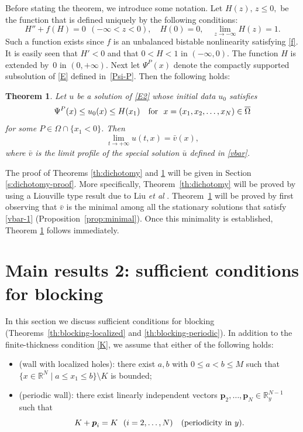 \documentclass[a4paper,12pt,fullpage]{article}
\numberwithin{equation}{section}
\newtheorem{Thm}{Theorem}
\def\R{{\mathbb R}}
\begin{document}
Before stating the theorem, we introduce some notation. Let $H(z),\,z\leq 0,$ be the function that is defined uniquely by the following conditions:
\[
H''+f(H)=0\ \ (-\infty<z<0), \quad H(0)=0,\quad \lim_{z\to-\infty}H(z)=1.
\]
Such a function exists since $f$ is an unbalanced bistable nonlinearity satisfying \eqref{f}. It is easily seen that $H'<0$ and that $0<H<1$ in $(-\infty,0)$. The function $H$ is extended by~$0$ in $(0,+\infty)$. Next let $\Psi^P(x)$ denote the compactly supported subsolution of \eqref{E} defined in~\eqref{Psi-P}. Then the following holds:

\begin{Thm}\label{th:general}
Let $u$ be a solution of \eqref{E2} whose initial data $u_0$ satisfies
\[
\Psi^P(x)\leq u_0(x)\leq H(x_1)\quad \hbox{for} \ \ x=(x_1,x_2,\ldots,x_N)\in \overline{\Omega}
\]
for some $P\in\Omega\cap\{x_1<0\}$. Then
\begin{equation}\label{limit-u}
\lim_{t\to+\infty} u(t,x)=\bar{v}(x),
\end{equation}
where $\bar{v}$ is the limit profile of the special solution $\bar{u}$ defined in \eqref{vbar}.
\end{Thm}

The proof of Theorems \ref{th:dichotomy} and \ref{th:general} will be given in Section \ref{s:dichotomy-proof}. More specifically, Theorem~\ref{th:dichotomy} will be proved by using a Liouville type result due to Liu {\it et al} \cite{LWWW}. Theorem~\ref{th:general} will be proved by first observing that $\bar{v}$ is the minimal among all the stationary solutions that satisfy \eqref{vbar-1} (Proposition~\ref{prop:minimal}). Once this minimality is established, Theorem \ref{th:general} follows immediately.


\section{Main results 2: sufficient conditions for blocking}\label{s:main-blocking}

In this section we discuss sufficient conditions for blocking (Theorems~\ref{th:blocking-localized} and \ref{th:blocking-periodic}). In addition to the finite-thickness condition \eqref{K}, we assume that either of the following holds:
\begin{itemize}
\item[{\bf (K1)}] (wall with localized holes): there exist $a,b$ with $0\leq a<b\leq M$ such that $\{x\in\R^N\mid a\leq x_1\leq b\}\setminus K$ is bounded;
\item[{\bf (K2)}] (periodic wall): there exist linearly independent vectors 
${\boldsymbol p}_2, \ldots, {\boldsymbol p}_{N}\in \R^{N-1}_y$ such that 
\begin{equation}\label{K-periodic}
K+{\boldsymbol p}_i=K\ \  (i=2,\ldots,N)\quad \hbox{(periodicity in $y$)}.
\end{equation}
\end{itemize}
\end{document}
